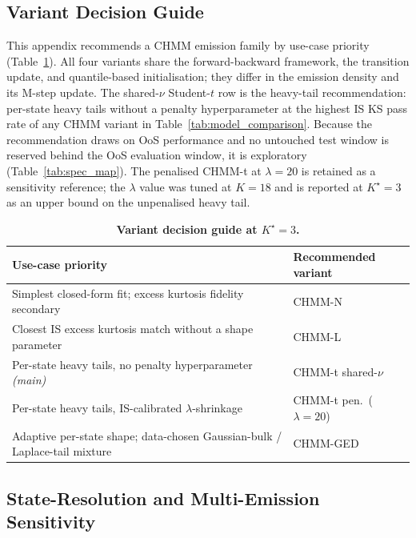 \subsection{Variant Decision Guide}
\label{sec:variant_decision_guide}

This appendix recommends a CHMM emission family by use-case priority (Table~\ref{tab:variant_choice}). All four variants share the forward-backward framework, the transition update, and quantile-based initialisation; they differ in the emission density and its M-step update. The shared-$\nu$ Student-$t$ row is the heavy-tail recommendation: per-state heavy tails without a penalty hyperparameter at the highest IS KS pass rate of any CHMM variant in Table~\ref{tab:model_comparison}. Because the recommendation draws on OoS performance and no untouched test window is reserved behind the OoS evaluation window, it is exploratory (Table~\ref{tab:spec_map}). The penalised CHMM-t at $\lambda = 20$ is retained as a sensitivity reference; the $\lambda$ value was tuned at $K = 18$ and is reported at $K^\star = 3$ as an upper bound on the unpenalised heavy tail.

\begin{table}[!ht]
\centering
\small
\caption{\textbf{Variant decision guide at $K^\star = 3$.}}
\label{tab:variant_choice}
\begin{tabular}{l l}
\toprule
Use-case priority & Recommended variant \\
\midrule
Simplest closed-form fit; excess kurtosis fidelity secondary              & CHMM-N \\
Closest IS excess kurtosis match without a shape parameter                & CHMM-L \\
Per-state heavy tails, no penalty hyperparameter \emph{(main)} & CHMM-t shared-$\nu$ \\
Per-state heavy tails, IS-calibrated $\lambda$-shrinkage           & CHMM-t pen.\ ($\lambda = 20$) \\
Adaptive per-state shape; data-chosen Gaussian-bulk / Laplace-tail mixture & CHMM-GED \\
\bottomrule
\end{tabular}
\end{table}

\subsection{State-Resolution and Multi-Emission Sensitivity}
\label{sec:supp_sensitivity}

